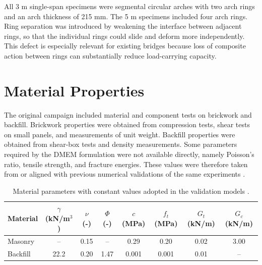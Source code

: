 All 3 m single-span specimens were segmental circular arches with two arch rings and an arch thickness of 215 mm. The 5 m specimens included four arch rings. Ring separation was introduced by weakening the interface between adjacent rings, so that the individual rings could slide and deform more independently. This defect is especially relevant for existing bridges because loss of composite action between rings can substantially reduce load-carrying capacity.

\section{Material Properties}
\label{sec:bolton-materials}

The original campaign included material and component tests on brickwork and backfill. Brickwork properties were obtained from compression tests, shear tests on small panels, and measurements of unit weight. Backfill properties were obtained from shear-box tests and density measurements. Some parameters required by the \gls{DMEM} formulation were not available directly, namely Poisson's ratio, tensile strength, and fracture energies. These values were therefore taken from or aligned with previous numerical validations of the same experiments \cite{Zhang2018,Tubaldi2020a,Zizi2024}.

\begin{table}[htbp]
\centering
\caption{Material parameters with constant values adopted in the validation models \cite{Bonatte2026DMEM}.}
\label{tab:dmem-constant-materials}
\begin{tabular}{lccccccc}
\hline
Material & $\gamma$ (kN/m$^3$) & $\nu$ (-) & $\Phi$ (-) & $c$ (MPa) & $f_t$ (MPa) & $G_t$ (kN/m) & $G_c$ (kN/m)\\
\hline
Masonry & -- & 0.15 & -- & 0.29 & 0.20 & 0.02 & 3.00\\
Backfill & 22.2 & 0.20 & 1.47 & 0.001 & 0.001 & 0.01 & --\\
\hline
\end{tabular}
\end{table}

